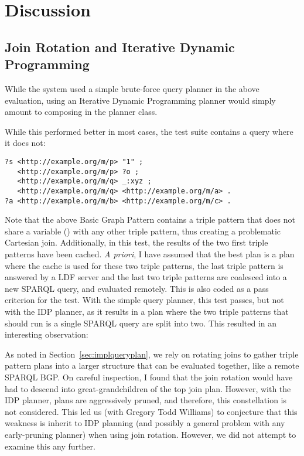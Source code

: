 \section{Discussion}

\subsection{Join Rotation and Iterative Dynamic
  Programming}

While the system used a simple brute-force query planner in the above
evaluation, using an Iterative Dynamic Programming planner
\cite{Kossmann:2000:IDP:352958.352982} would simply amount to
composing  in the planner class.

While this performed better in most cases, the test suite contains a
query where it does not:
\begin{verbatim}
?s <http://example.org/m/p> "1" ;
   <http://example.org/m/p> ?o ;
   <http://example.org/m/q> _:xyz ;
   <http://example.org/m/q> <http://example.org/m/a> .
?a <http://example.org/m/b> <http://example.org/m/c> .
\end{verbatim}
Note that the above Basic Graph Pattern contains a triple pattern that
does not share a variable () with any other triple pattern,
thus creating a problematic Cartesian join. Additionally, in this
test, the results of the two first triple patterns have been
cached. \textit{A priori}, I have assumed that the best plan is a plan
where the cache is used for these two triple patterns, the last triple
pattern is answered by a LDF server and the last two
triple patterns are coalesced into a new SPARQL query, and evaluated
remotely. This is also coded as a pass criterion for the test. With
the simple query planner, this test passes, but not with the IDP
planner, as it results in a plan where the two triple patterns that
should run is a single SPARQL query are split into two. This resulted
in an interesting observation:

As noted in Section~\ref{sec:implqueryplan}, we rely on rotating joins
to gather triple pattern plans into a larger structure that can be
evaluated together, like a remote SPARQL BGP. On careful inspection, I
found that the join rotation would have had to descend into
great-grandchildren of the top join plan. However, with the IDP
planner, plans are aggressively pruned, and therefore, this
constellation is not considered. This led us (with Gregory Todd
Williams) to conjecture that this weakness is inherit to IDP planning
(and possibly a general problem with any early-pruning planner) 
when using join rotation. However, we did not attempt to examine this any
further.

